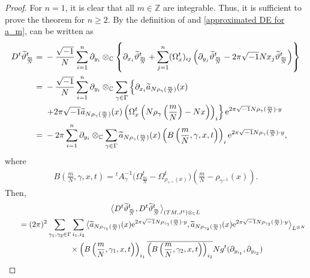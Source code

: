 \documentclass[10pt,a4paper]{amsart}
\numberwithin{equation}{section}
\newcommand{\C}{\mathbb{C}}
\newcommand{\Z}{\mathbb{Z}}
\renewcommand{\tilde}{\widetilde}
\begin{document}
\begin{proof}%
For $n=1$, it is clear that all $m\in \Z$ are integrable. Thus, it is sufficient to prove the theorem for $n\ge 2$. By the definition of \smash{${\tilde \vartheta}^t_{\frac{m}{N}}$} and \eqref{approximated DE for a_m}, \smash{$D^t {\tilde \vartheta}^t_{\frac{m}{N}}$} can be written as
\begin{align*}
D^t {\tilde \vartheta}^t_{\frac{m}{N}}
={}&-\frac{\sqrt{-1}}{N}\sum_{i=1}^n\partial_{y_i}\otimes_{\C}\left\{\partial_{x_i}{\tilde \vartheta}^t_{\frac{m}{N}}+\sum_{j=1}^n(\Omega^t_x)_{ij}\left(\partial_{y_j}{\tilde \vartheta}^t_{\frac{m}{N}}-2\pi\sqrt{-1}Nx_j {\tilde \vartheta}^t_{\frac{m}{N}}\right)\right\} \\
={}&-\frac{\sqrt{-1}}{N}\sum_{i=1}^n\partial_{y_i}\otimes_{\C}\sum_{\gamma \in \Gamma}\left\{\partial_{x_i}{\tilde a}_{N\rho_\gamma (\frac{m}{N})}(x)\right.\\
&\left. +2\pi\sqrt{-1}{\tilde a}_{N\rho_\gamma (\frac{m}{N})}(x) \left(\Omega^t_x \left( N\rho_{\gamma}\left(\frac{m}{N}\right)-Nx\right)\right)_i \right\} {\rm e}^{2\pi\sqrt{-1}N\rho_\gamma (\frac{m}{N})\cdot y} \\
={}&-2\pi \sum_{i=1}^n\partial_{y_i}\otimes_{\C}\sum_{\gamma \in \Gamma}{\tilde a}_{N\rho_\gamma (\frac{m}{N})}(x)\left( B\left(\frac{m}{N},\gamma, x,t\right)\right)_i {\rm e}^{2\pi\sqrt{-1}N\rho_\gamma (\frac{m}{N})\cdot y},
\end{align*}
where
\begin{align*}
B\left(\frac{m}{N}, \gamma ,x,t\right)={}^tA_{\gamma}^{-1}\bigl( \Omega^t_{\frac{m}{N}}-\Omega^t_{\rho_{\gamma^{-1}}(x)}\bigr)\left(\frac{m}{N}-\rho_{\gamma^{-1}}(x)\right).
\end{align*}
Then,
\begin{gather*}
\big\langle D^t {\tilde \vartheta}^t_{\frac{m}{N}} ,D^t {\tilde \vartheta}^t_{\frac{m}{N}} \big\rangle_{(TM, J^t)\otimes_{\C}L}\\
\qquad=(2\pi)^2\sum_{\gamma_1, \gamma_2 \in \Gamma}\sum_{i_1, i_2}\big\langle {\tilde a}_{N\rho_{\gamma_1} (\frac{m}{N})}(x){\rm e}^{2\pi\sqrt{-1}N\rho_{\gamma_1} (\frac{m}{N})\cdot y}, {\tilde a}_{N\rho_{\gamma_2} (\frac{m}{N})}(x){\rm e}^{2\pi\sqrt{-1}N\rho_{\gamma_2} (\frac{m}{N})\cdot y}\big\rangle_{L^{\otimes N}}\\
\phantom{\qquad=}{}\times \left( B\left(\frac{m}{N}, \gamma_1 ,x,t\right)\right)_{i_1}\overline{ \left( B\left(\frac{m}{N}, \gamma_2 ,x,t\right)\right)_{i_2}}Ng^t(\partial_{y_{i_1}}, \partial_{y_{i_2}})\\

\end{gather*}
\end{proof}
\end{document}
